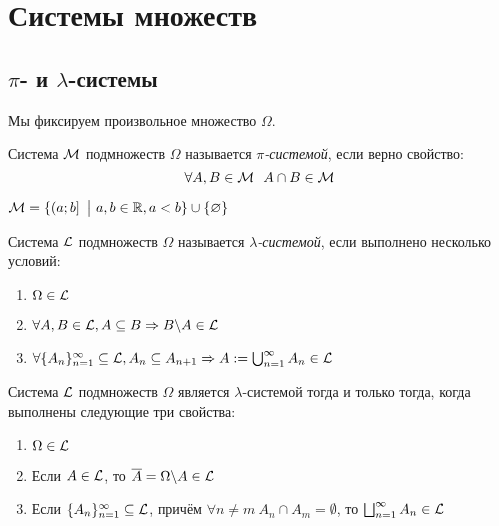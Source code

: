 \section{Системы множеств}

\subsection{$\pi$- и $\lambda$-системы}

\begin{note}
	Мы фиксируем произвольное множество $\Omega$.
\end{note}

\begin{definition}
	Система $\mathcal{M}$ подмножеств $\Omega$ называется \textit{$\pi$-системой}, если верно свойство:
	\[
		\forall A, B \in \cM\ \ A \cap B \in \cM
	\]
\end{definition}

\begin{example}
	$\mathcal{M} = \{\left(a; b\right] \ \big|\  a, b \in \mathbb{R}, a < b\} \cup \{\varnothing\}$
\end{example}

\begin{definition}
	Система $\mathcal{L}$ подмножеств $\Omega$ называется \textit{$\lambda$-системой}, если выполнено несколько условий:
	\begin{enumerate}
		\item $\Omega \in \mathcal{L}$
		
		\item $\forall A, B \in \mathcal{L}, A \subseteq B \Rightarrow B \backslash A \in \mathcal{L}$
		
		\item $\forall \{A_n\}_{n = 1}^\infty \subseteq \mathcal{L}, A_n \subseteq A_{n + 1} \Rightarrow A := \bigcup_{n = 1}^\infty A_n \in \mathcal{L}$
	\end{enumerate}
\end{definition}

\begin{proposition}
	Система $\mathcal{L}$ подмножеств $\Omega$ является $\lambda$-системой тогда и только тогда, когда выполнены следующие три свойства:
	\begin{enumerate}
		\item $\Omega \in \mathcal{L}$
		
		\item Если $A \in \mathcal{L}$, то $\overline{A} = \Omega \backslash A \in \mathcal{L}$
		
		\item Если $\{A_n\}_{n = 1}^\infty \subseteq \mathcal{L}$, причём $\forall n \neq m\ A_n \cap A_m = \emptyset$, то $\bigsqcup_{n = 1}^\infty A_n \in \mathcal{L}$
	\end{enumerate}
\end{proposition}

